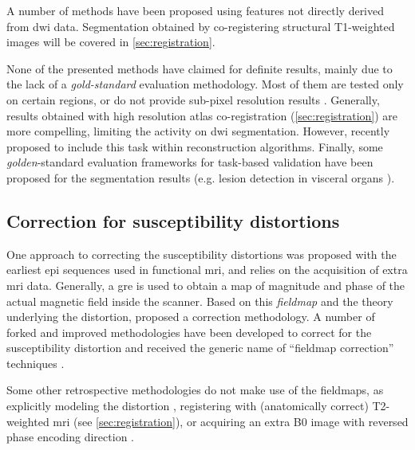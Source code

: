 A number of methods have been proposed using features not directly derived from \gls{dwi} data.
Segmentation obtained by co-registering structural T1-weighted images will be covered in 
\autoref{sec:registration}. 

None of the presented methods have claimed for definite results, mainly due to the lack of 
a \emph{gold-standard} evaluation methodology. Most of them are tested only on certain
regions, or do not provide sub-pixel resolution results
\citep{hadjiprocopis_unbiased_2005,liu_brain_2007,awate_multivariate_2008,lu_segmentation_2008,
han_experimental_2009}. Generally, results obtained with high resolution atlas co-registration
(\autoref{sec:registration}) are more compelling, limiting the activity on \gls{dwi} 
segmentation. However, recently \citep{kumazawa_improvement_2013} proposed to include this
task within reconstruction algorithms. Finally, some \emph{golden}-standard evaluation
frameworks for task-based validation have been proposed for the segmentation results
(e.g. lesion detection in visceral organs \citep{jha_task-based_2012}).

\subsection{Correction for susceptibility distortions}
\label{sec:distortion}

One approach to correcting the susceptibility distortions was proposed
with the earliest \gls{epi} sequences used in functional \gls{mri}, and
relies on the acquisition of extra \gls{mri} data. Generally, a \gls{gre} is used to 
obtain a map of magnitude and phase of the actual magnetic field inside the
scanner. Based on this \emph{fieldmap} and the theory underlying the 
distortion, \citep{jezzard_characterization_2005} proposed a correction 
methodology. A number of forked and improved methodologies have been 
developed to correct for the susceptibility distortion and received the
generic name of ``fieldmap correction'' techniques \cite{hsu_correction_2009,
reber_correction_2005}.

Some other retrospective methodologies do not make use of the fieldmaps, 
as explicitly modeling the distortion \citep{andersson_modeling_2001},
registering with (anatomically correct) T2-weighted \gls{mri} 
\citep{kybic_unwarping_2000,studholme_accurate_2000,li_accounting_2007,
tao_variational_2009} (see \autoref{sec:registration}), or acquiring an 
extra B0 image with reversed phase encoding direction 
\citep{andersson_how_2003,holland_efficient_2010}.

